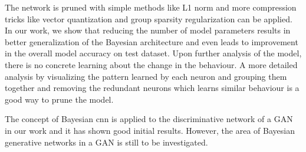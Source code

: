 \newline The network is pruned with simple methods like L1 norm and more compression tricks like vector quantization \cite{DBLP:journals/corr/GongLYB14} and group sparsity regularization  \cite{DBLP:conf/nips/AlvarezS16} can be applied. In our work, we show that reducing the number of model parameters results in better generalization of the Bayesian architecture and even leads to improvement in the overall model accuracy on test dataset. Upon further analysis of the model, there is no concrete learning about the change in the behaviour. A more detailed analysis by visualizing the pattern learned by each neuron and grouping them together and removing the redundant neurons which learns similar behaviour is a good way to prune the model.

\newline The concept of Bayesian \ac{cnn} is applied to the discriminative network of a GAN in our work and it has shown good initial results. However, the area of Bayesian generative networks in a GAN is still to be investigated.